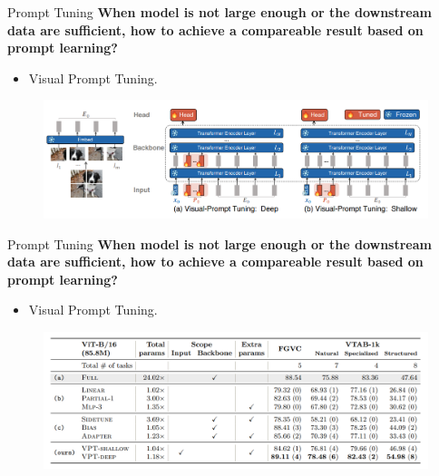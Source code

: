 \documentclass[notheorems, aspectratio=54]{beamer}
\begin{document}
\begin{frame}{Prompt Tuning}
  \textbf{When model is not large enough or the downstream data are sufficient, how to achieve a compareable result based on prompt learning?}
  \begin{itemize}
    \item Visual Prompt Tuning.  
  \end{itemize}

  \begin{figure}[!h]
    \centering
    \includegraphics[width=1\linewidth]{figures/VPT-fig3.png}
  \end{figure}
\end{frame}

\begin{frame}{Prompt Tuning}
  \textbf{When model is not large enough or the downstream data are sufficient, how to achieve a compareable result based on prompt learning?}
  \begin{itemize}
    \item Visual Prompt Tuning.  
  \end{itemize}

  \begin{figure}[!h]
    \centering
    \includegraphics[width=1\linewidth]{figures/VPT-tab1.png}
  \end{figure}
\end{frame}
\end{document}
